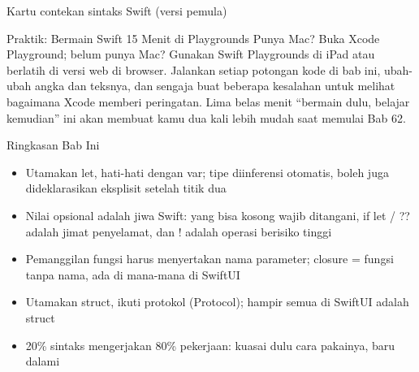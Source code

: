 \begin{center}\small\color{gray}Kartu contekan sintaks Swift (versi pemula)\end{center}

\begin{tcbpractice}{Praktik: Bermain Swift 15 Menit di Playgrounds}
Punya Mac? Buka Xcode Playground; belum punya Mac? Gunakan Swift Playgrounds di iPad atau berlatih di versi web di browser. Jalankan setiap potongan kode di bab ini, ubah-ubah angka dan teksnya, dan sengaja buat beberapa kesalahan untuk melihat bagaimana Xcode memberi peringatan. Lima belas menit “bermain dulu, belajar kemudian” ini akan membuat kamu dua kali lebih mudah saat memulai Bab 62.

\end{tcbpractice}

\begin{tcbsummary}{Ringkasan Bab Ini}
\begin{itemize}
  \item Utamakan let, hati-hati dengan var; tipe diinferensi otomatis, boleh juga dideklarasikan eksplisit setelah titik dua
  \item Nilai opsional adalah jiwa Swift: yang bisa kosong wajib ditangani, if let / ?? adalah jimat penyelamat, dan ! adalah operasi berisiko tinggi
  \item Pemanggilan fungsi harus menyertakan nama parameter; closure = fungsi tanpa nama, ada di mana-mana di SwiftUI
  \item Utamakan struct, ikuti protokol (Protocol); hampir semua di SwiftUI adalah struct
  \item 20\% sintaks mengerjakan 80\% pekerjaan: kuasai dulu cara pakainya, baru dalami
\end{itemize}

\end{tcbsummary}
